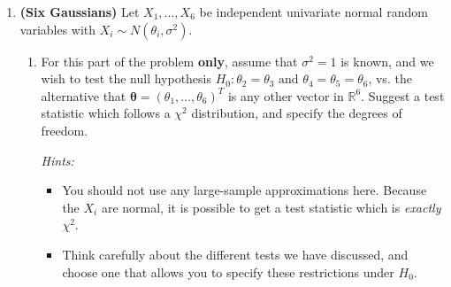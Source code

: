 \documentclass[11pt]{article}
\begin{document}
\begin{enumerate}
Suppose that $X_1,...,X_n \overset{iid}{\sim} Geometric(\theta)$.

\begin{enumerate}
\item Find the maximum likelihood estimator $\widehat{\theta}$.

\item Show that $\widehat{\theta} \overset{p}{\to} \theta$. (While it is true that MLEs are generally consistent, I do not want you to use that general fact here; rather, I want you to show it directly using your estimator from part (a)).

\item Find the asymptotic distribution of $\sqrt{n}(\widehat{\theta} - \theta)$. You may use our usual asymptotic results, and assume that any necessary regularity conditions hold.

\item Use part (c) to construct a Wald confidence interval for $\theta$.
\end{enumerate}

\bigskip

\item \textbf{(Six Gaussians)} Let $X_1,...,X_6$ be independent univariate normal random variables with $X_i \sim N(\theta_i, \sigma^2)$.

\begin{enumerate}
\item For this part of the problem \textbf{only}, assume that $\sigma^2 = 1$ is known, and we wish to test the null hypothesis $H_0: \theta_2 = \theta_3 \text{ and } \theta_4 = \theta_5 = \theta_6$, vs. the alternative that $\boldsymbol{\theta} = (\theta_1,...,\theta_6)^T$ is any other vector in $\mathbb{R}^6$. Suggest a test statistic which follows a $\chi^2$ distribution, and specify the degrees of freedom.

\textit{Hints:}
\begin{itemize}
\item You should not use any large-sample approximations here. Because the $X_i$ are normal, it is possible to get a test statistic which is \textit{exactly} $\chi^2$.
\item Think carefully about the different tests we have discussed, and choose one that allows you to specify these restrictions under $H_0$.
\end{itemize}


\end{enumerate}
\end{enumerate}
\end{document}
